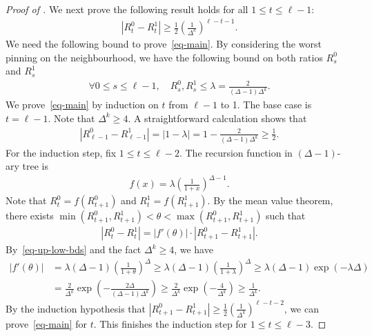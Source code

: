 \documentclass[11pt,a4paper]{amsart}
\newcommand{\tp}[1]{{\left( #1 \right)}}
\newcommand{\abs}[1]{\ensuremath{\left\vert#1\right\vert}}
\theoremstyle{definition}
\theoremstyle{remark}
\begin{document}
\begin{proof}[Proof of ]
We next prove the following result holds for all $1 \leq t \leq \ell - 1$:
\begin{align}\label{eq-main}
	\abs{R^0_t  - R^1_t } \geq \frac{1}{2}\tp{\frac{1}{\Delta^k}}^{\ell  -t - 1}.
\end{align}
We need the following bound to prove~\eqref{eq-main}.
By considering the worst pinning on the neighbourhood, 
we have the following bound on both ratios $R^0_s$ and $R^1_s$
\begin{align}\label{eq-up-low-bds}
\forall 0\leq s \leq \ell - 1, \quad  R^0_s,R^1_s \leq \lambda = \frac{2}{(\Delta - 1)\Delta^{k}}.
\end{align}
We prove~\eqref{eq-main} by induction on $t$ from $\ell - 1$ to 1.
The base case is $t = \ell - 1$. 
Note that $\Delta^k \geq 4$.
A straightforward calculation shows that
\begin{align*}
	\abs{R^0_{\ell - 1} - R^1_{\ell - 1}} = \abs{ 1 - \lambda} = 1 - \frac{2}{(\Delta - 1)\Delta^{k}} \geq \frac{1}{2}.
\end{align*}
For the induction step, fix $1 \leq t \leq \ell - 2$. %
The recursion function in $(\Delta-1)$-ary tree is
\begin{align*}
	f(x) = \lambda \tp{\frac{1}{1+x}}^{\Delta - 1}.
\end{align*}
Note that $R^0_t = f(R^0_{t+1})$ and $R^1_t = f(R^1_{t+1})$. By the mean value theorem, there exists $\min(R^0_{t+1}, R^1_{t+1}) < \theta < \max(R^0_{t+1}, R^1_{t+1}) $ such that 
\begin{align*}
	\abs{R^0_t  - R^1_t } = |f'(\theta)| \cdot  \abs{R^0_{t+1} - R^1_{t+1}}. 
\end{align*}
By~\eqref{eq-up-low-bds} and the fact $\Delta^k \geq 4$, we have
\begin{align*}
	\abs{f'(\theta)} &= \lambda(\Delta - 1) \tp{\frac{1}{1+\theta}}^{\Delta} \geq \lambda(\Delta - 1)\tp{\frac{1}{1+\lambda}}^{\Delta} \geq \lambda(\Delta - 1)\exp(-\lambda\Delta)\\
	&= \frac{2}{\Delta^k} \exp \tp{ - \frac{2\Delta}{(\Delta - 1)\Delta^k} } \geq \frac{2}{\Delta^k} \exp \tp{ - \frac{4}{\Delta^k} } \geq \frac{1}{\Delta^k}.
\end{align*}
By the induction hypothesis that $\abs{R^0_{t+1} - R^1_{t+1}} \geq \frac{1}{2} (\frac{1}{\Delta^k})^{\ell - t - 2} $, we can prove~\eqref{eq-main} for $t$. This finishes the induction step for $1 \leq t \leq \ell - 3$.


\end{proof}
\end{document}
